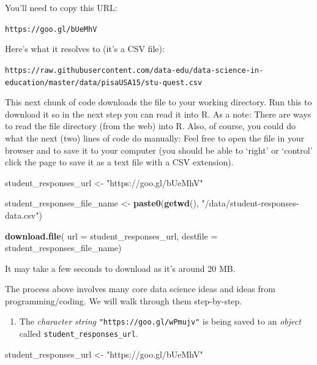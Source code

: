 \documentclass[]{book}
\newenvironment{Shaded}{\begin{snugshade}}{\end{snugshade}}
\newcommand{\KeywordTok}[1]{\textcolor[rgb]{0.13,0.29,0.53}{\textbf{#1}}}
\newcommand{\DataTypeTok}[1]{\textcolor[rgb]{0.13,0.29,0.53}{#1}}
\newcommand{\StringTok}[1]{\textcolor[rgb]{0.31,0.60,0.02}{#1}}
\newcommand{\NormalTok}[1]{#1}
\providecommand{\tightlist}{%
  \setlength{\itemsep}{0pt}\setlength{\parskip}{0pt}}
\begin{document}
You'll need to copy this URL:

\texttt{https://goo.gl/bUeMhV}

Here's what it resolves to (it's a CSV file):

\texttt{https://raw.githubusercontent.com/data-edu/data-science-in-education/master/data/pisaUSA15/stu-quest.csv}

This next chunk of code downloads the file to your working directory.
Run this to download it so in the next step you can read it into R. As a
note: There are ways to read the file directory (from the web) into R.
Also, of course, you could do what the next (two) lines of code do
manually: Feel free to open the file in your browser and to save it to
your computer (you should be able to `right' or `control' click the page
to save it as a text file with a CSV extension).

\begin{Shaded}
\begin{Highlighting}[]
\NormalTok{student_responses_url <-}
\StringTok{    "https://goo.gl/bUeMhV"}

\NormalTok{student_responses_file_name <-}
\StringTok{    }\KeywordTok{paste0}\NormalTok{(}\KeywordTok{getwd}\NormalTok{(), }\StringTok{"/data/student-responses-data.csv"}\NormalTok{)}

\KeywordTok{download.file}\NormalTok{(}
    \DataTypeTok{url =}\NormalTok{ student_responses_url,}
    \DataTypeTok{destfile =}\NormalTok{ student_responses_file_name)}
\end{Highlighting}
\end{Shaded}

It may take a few seconds to download as it's around 20 MB.

The process above involves many core data science ideas and ideas from
programming/coding. We will walk through them step-by-step.

\begin{enumerate}
\def\labelenumi{\arabic{enumi}.}
\tightlist
\item
  The \emph{character string} \texttt{"https://goo.gl/wPmujv"} is being
  saved to an \emph{object} called \texttt{student\_responses\_url}.
\end{enumerate}

\begin{Shaded}
\begin{Highlighting}[]
\NormalTok{student_responses_url <-}
\StringTok{    "https://goo.gl/bUeMhV"}
\end{Highlighting}
\end{Shaded}
\end{document}
